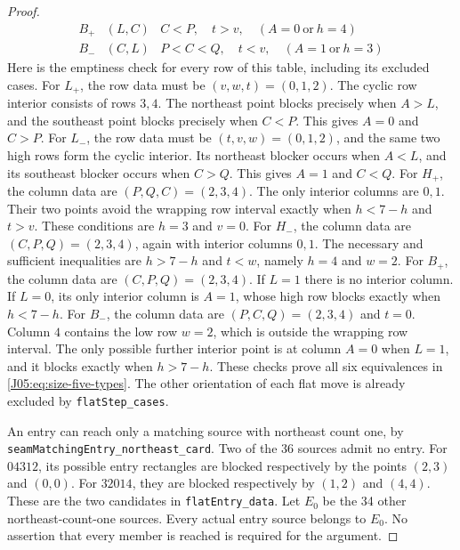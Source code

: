\documentclass[11pt,oneside]{report}
\theoremstyle{definition}
\numberwithin{equation}{section}
\newcommand{\decl}[1]{\textnormal{\nolinkurl{#1}}}
\begin{document}
\begin{proof}
\[\begin{array}{c|c|l}
 B_+&(L,C)&C<P,\quad t>v,\quad (A=0\ \text{or}\ h=4)\\
 B_-&(C,L)&P<C<Q,\quad t<v,\quad (A=1\ \text{or}\ h=3)
\end{array}
\tag{J05.F5.1}\label{J05:eq:size-five-types}
\]
Here is the emptiness check for every row of this table, including its
excluded cases. For $L_+$, the row data must be $(v,w,t)=(0,1,2)$.
The cyclic row interior consists of rows $3,4$.
The northeast point blocks precisely when $A>L$, and the southeast
point blocks precisely when $C<P$. This gives $A=0$ and $C>P$.
For $L_-$, the row data must be $(t,v,w)=(0,1,2)$, and the same two
high rows form the cyclic interior. Its northeast blocker occurs when
$A<L$, and its southeast blocker occurs when $C>Q$.
This gives $A=1$ and $C<Q$.
For $H_+$, the column data are $(P,Q,C)=(2,3,4)$.
The only interior columns are $0,1$. Their two points avoid the
wrapping row interval exactly when $h<7-h$ and $t>v$.
These conditions are $h=3$ and $v=0$.
For $H_-$, the column data are $(C,P,Q)=(2,3,4)$, again with interior
columns $0,1$. The necessary and sufficient inequalities are
$h>7-h$ and $t<w$, namely $h=4$ and $w=2$.
For $B_+$, the column data are $(C,P,Q)=(2,3,4)$.
If $L=1$ there is no interior column. If $L=0$, its only interior
column is $A=1$, whose high row blocks exactly when $h<7-h$.
For $B_-$, the column data are $(P,C,Q)=(2,3,4)$ and $t=0$.
Column $4$ contains the low row $w=2$, which is outside the wrapping
row interval. The only possible further interior point is at column
$A=0$ when $L=1$, and it blocks exactly when $h>7-h$.
These checks prove all six equivalences in
\eqref{J05:eq:size-five-types}. The other orientation of each flat move
is already excluded by \decl{flatStep_cases}.

An entry can reach only a matching source with northeast count one,
by \decl{seamMatchingEntry_northeast_card}.
Two of the 36 sources admit no entry. For $04312$, its possible entry
rectangles are blocked respectively by the points $(2,3)$ and $(0,0)$.
For $32014$, they are blocked respectively by $(1,2)$ and $(4,4)$.
These are the two candidates in \decl{flatEntry_data}.
Let $E_0$ be the 34 other northeast-count-one sources.
Every actual entry source belongs to $E_0$. No assertion that every
member is reached is required for the argument.


\end{proof}
\end{document}
